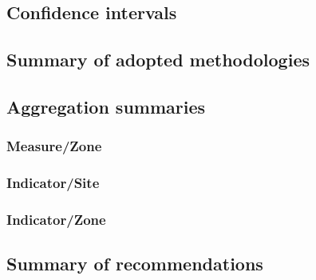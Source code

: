 \documentclass[a4paper,8pt]{AIMSreport}
\begin{document}
\subsection{Confidence intervals}

\subsection{Summary of adopted methodologies}
\subsection{Aggregation summaries}
\subsubsection{Measure/Zone}
\subsubsection{Indicator/Site}
\subsubsection{Indicator/Zone}

\subsection{Summary of recommendations}
 
~\\[2em]



\clearpage
\end{document}
